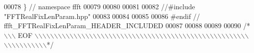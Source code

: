 \begin{DoxyCode}
00078 \}   \textcolor{comment}{// namespace ffft}
00079 
00080 
00081 
00082 \textcolor{comment}{//#include  "FFTRealFixLenParam.hpp"}
00083 
00084 
00085 
00086 \textcolor{preprocessor}{#endif  // ffft\_FFTRealFixLenParam\_HEADER\_INCLUDED}
00087 
00088 
00089 
00090 \textcolor{comment}{/*\(\backslash\)\(\backslash\)\(\backslash\) EOF \(\backslash\)\(\backslash\)\(\backslash\)\(\backslash\)\(\backslash\)\(\backslash\)\(\backslash\)\(\backslash\)\(\backslash\)\(\backslash\)\(\backslash\)\(\backslash\)\(\backslash\)\(\backslash\)\(\backslash\)\(\backslash\)\(\backslash\)\(\backslash\)\(\backslash\)\(\backslash\)\(\backslash\)\(\backslash\)\(\backslash\)\(\backslash\)\(\backslash\)\(\backslash\)\(\backslash\)\(\backslash\)\(\backslash\)\(\backslash\)\(\backslash\)\(\backslash\)\(\backslash\)\(\backslash\)\(\backslash\)\(\backslash\)\(\backslash\)\(\backslash\)\(\backslash\)\(\backslash\)\(\backslash\)\(\backslash\)\(\backslash\)\(\backslash\)\(\backslash\)\(\backslash\)\(\backslash\)\(\backslash\)\(\backslash\)\(\backslash\)\(\backslash\)\(\backslash\)\(\backslash\)\(\backslash\)\(\backslash\)\(\backslash\)\(\backslash\)\(\backslash\)\(\backslash\)\(\backslash\)\(\backslash\)\(\backslash\)\(\backslash\)\(\backslash\)\(\backslash\)\(\backslash\)*/}
\end{DoxyCode}
